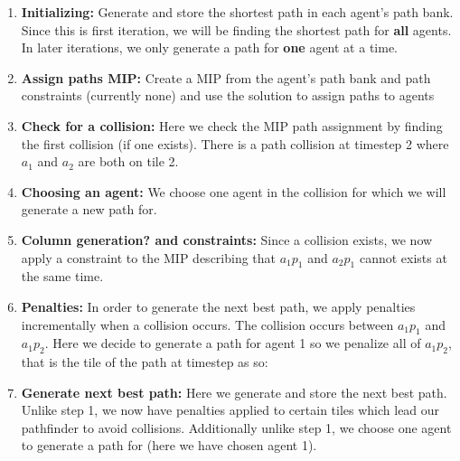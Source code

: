 \documentclass[a4paper,11pt]{article}
\begin{document}
\begin{enumerate}
	\item \textbf{Initializing:} Generate and store the shortest path in each agent's path bank. Since this is first iteration, we will be finding the shortest path for \textbf{all} agents. In later iterations, we only generate a path for \textbf{one} agent at a time.
	\item \textbf{Assign paths MIP:} Create a MIP from the agent's path bank and path constraints (currently none) and use the solution to assign paths to agents
	\item \textbf{Check for a collision:} Here we check the MIP path assignment by finding the first collision (if one exists). There is a path collision at timestep 2 where $a_1$ and $a_2$ are both on tile 2.
	\item \textbf{Choosing an agent:} We choose one agent in the collision for which we will generate a new path for.
	\item \textbf{Column generation? and constraints:} Since a collision exists, we now apply a constraint to the MIP describing that $a_1p_1$ and $a_2p_1$ cannot exists at the same time.
	\item \textbf{Penalties:} In order to generate the next best path, we apply penalties incrementally when a collision occurs. The collision occurs between $a_1p_1$ and $a_1p_2$. Here we decide to generate a path for agent 1 so we penalize all of $a_1p_2$, that is the tile of the path at timestep as so:
	\item \textbf{Generate next best path:} Here we generate and store the next best path. Unlike step 1, we now have penalties applied to certain tiles which lead our pathfinder to avoid collisions. Additionally unlike step 1, we choose one agent to generate a path for (here we have chosen agent 1).

\end{enumerate}
\end{document}
